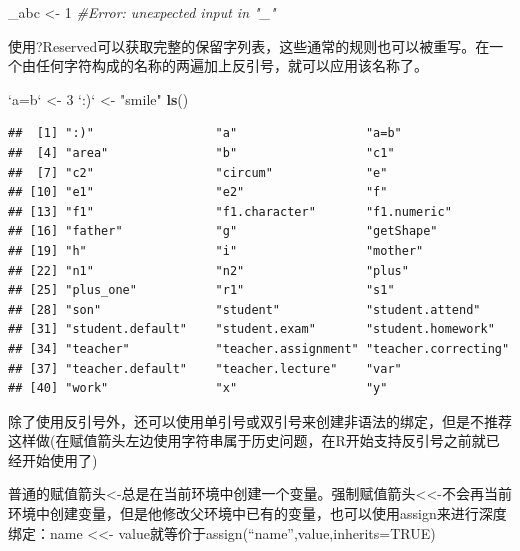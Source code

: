 \documentclass[]{book}
\newenvironment{Shaded}{\begin{snugshade}}{\end{snugshade}}
\newcommand{\KeywordTok}[1]{\textcolor[rgb]{0.13,0.29,0.53}{\textbf{#1}}}
\newcommand{\DataTypeTok}[1]{\textcolor[rgb]{0.13,0.29,0.53}{#1}}
\newcommand{\DecValTok}[1]{\textcolor[rgb]{0.00,0.00,0.81}{#1}}
\newcommand{\StringTok}[1]{\textcolor[rgb]{0.31,0.60,0.02}{#1}}
\newcommand{\CommentTok}[1]{\textcolor[rgb]{0.56,0.35,0.01}{\textit{#1}}}
\newcommand{\NormalTok}[1]{#1}
\begin{document}
\begin{Shaded}
\begin{Highlighting}[]
\NormalTok{_abc <-}\StringTok{ }\DecValTok{1}
\CommentTok{#Error: unexpected input in "_"}
\end{Highlighting}
\end{Shaded}

使用?Reserved可以获取完整的保留字列表，这些通常的规则也可以被重写。在一个由任何字符构成的名称的两遍加上反引号，就可以应用该名称了。

\begin{Shaded}
\begin{Highlighting}[]
\StringTok{`}\DataTypeTok{a=b}\StringTok{`}\NormalTok{ <-}\StringTok{ }\DecValTok{3}
\StringTok{`}\DataTypeTok{:)}\StringTok{`}\NormalTok{ <-}\StringTok{ "smile"}
\KeywordTok{ls}\NormalTok{()}
\end{Highlighting}
\end{Shaded}

\begin{verbatim}
##  [1] ":)"                 "a"                  "a=b"               
##  [4] "area"               "b"                  "c1"                
##  [7] "c2"                 "circum"             "e"                 
## [10] "e1"                 "e2"                 "f"                 
## [13] "f1"                 "f1.character"       "f1.numeric"        
## [16] "father"             "g"                  "getShape"          
## [19] "h"                  "i"                  "mother"            
## [22] "n1"                 "n2"                 "plus"              
## [25] "plus_one"           "r1"                 "s1"                
## [28] "son"                "student"            "student.attend"    
## [31] "student.default"    "student.exam"       "student.homework"  
## [34] "teacher"            "teacher.assignment" "teacher.correcting"
## [37] "teacher.default"    "teacher.lecture"    "var"               
## [40] "work"               "x"                  "y"
\end{verbatim}

除了使用反引号外，还可以使用单引号或双引号来创建非语法的绑定，但是不推荐这样做(在赋值箭头左边使用字符串属于历史问题，在R开始支持反引号之前就已经开始使用了)

普通的赋值箭头\textless{}-总是在当前环境中创建一个变量。强制赋值箭头\textless{}\textless{}-不会再当前环境中创建变量，但是他修改父环境中已有的变量，也可以使用assign来进行深度绑定：name
\textless{}\textless{}-
value就等价于assign(``name'',value,inherits=TRUE)
\end{document}
